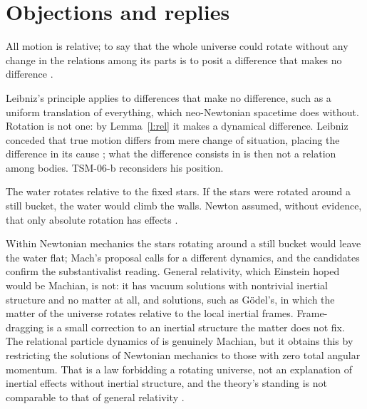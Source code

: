 \documentclass{situationist-preprint}
\begin{document}
\section{Objections and replies}\label{s:obj}

\begin{objection}[Leibniz]\label{o:leib}
All motion is relative; to say that the whole universe could rotate without any change in the relations among its parts is to posit a difference that makes no difference \citep{Leibniz1716}.
\end{objection}

\begin{reply}
Leibniz's principle applies to differences that make no difference, such as a uniform translation of everything, which neo-Newtonian spacetime does without. Rotation is not one: by Lemma~\ref{l:rel} it makes a dynamical difference. Leibniz conceded that true motion differs from mere change of situation, placing the difference in its cause \citep{Leibniz1716}; what the difference consists in is then not a relation among bodies. TSM-06-b reconsiders his position.
\end{reply}

\begin{objection}[Mach]\label{o:mach}
The water rotates relative to the fixed stars. If the stars were rotated around a still bucket, the water would climb the walls. Newton assumed, without evidence, that only absolute rotation has effects \citep{Mach1883}.
\end{objection}

\begin{reply}
Within Newtonian mechanics the stars rotating around a still bucket would leave the water flat; Mach's proposal calls for a different dynamics, and the candidates confirm the substantivalist reading. General relativity, which Einstein hoped would be Machian, is not: it has vacuum solutions with nontrivial inertial structure and no matter at all, and solutions, such as G\"odel's, in which the matter of the universe rotates relative to the local inertial frames. Frame-dragging is a small correction to an inertial structure the matter does not fix. The relational particle dynamics of \citet{BarbourBertotti1982} is genuinely Machian, but it obtains this by restricting the solutions of Newtonian mechanics to those with zero total angular momentum. That is a law forbidding a rotating universe, not an explanation of inertial effects without inertial structure, and the theory's standing is not comparable to that of general relativity \citep{Pooley2013}.
\end{reply}
\end{document}

